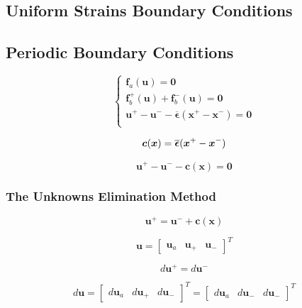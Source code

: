 \documentclass[3p]{elsarticle}
\begin{document}
\subsection{Uniform Strains Boundary Conditions}

\subsection{Periodic Boundary Conditions}

\begin{equation}
\left\{
\begin{array}{ll}
\bm{f}_a(\bm{u}) = \bm{0} \\
\bm{f}_b^+(\bm{u}) + \bm{f}_b^-(\bm{u}) = \bm{0} \\
\bm{u}^+ - \bm{u}^- - \overline{\bm{\epsilon}} ( \bm{x}^+ - \bm{x}^- ) = \bm{0}\\
\end{array}
\right.
\end{equation}

\begin{equation}
\bm{c}(\bm{x}) = \overline{\bm{\epsilon}} ( \bm{x}^+ - \bm{x}^- ) \\
\end{equation}

\begin{equation}
\bm{u}^+ - \bm{u}^- - \bm{c}(\bm{x}) = \bm{0}
\end{equation}

\subsubsection{The Unknowns Elimination Method}

\begin{equation}
\bm{u}^+ = \bm{u}^- + \bm{c}(\bm{x}) 
\end{equation}

\begin{equation}
\bm{u} = \begin{bmatrix}\bm{u}_a & \bm{u}_+ & \bm{u}_-\end{bmatrix}^T
\end{equation}

\begin{equation}
d\bm{u}^+ = d\bm{u}^-
\end{equation}

\begin{equation}
d\bm{u} = \begin{bmatrix}d\bm{u}_a & d\bm{u}_+ & d\bm{u}_-\end{bmatrix}^T = \begin{bmatrix}d\bm{u}_a & d\bm{u}_- & d\bm{u}_-\end{bmatrix}^T
\end{equation}
\end{document}
